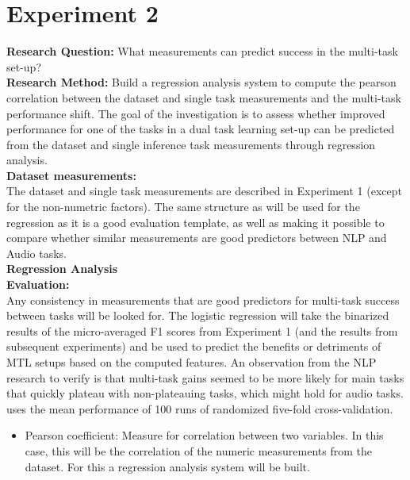 \section{Experiment 2}

\textbf{Research Question:} What measurements can predict success in the multi-task set-up? \\

\textbf{Research Method:} Build a regression analysis system to compute the pearson correlation between the dataset and single task measurements and the multi-task performance shift. The goal of the investigation is to assess whether improved performance for one of the tasks in a dual task learning set-up can be predicted from the dataset and single inference task measurements through regression analysis.\\

\textbf{Dataset measurements:}\\
The dataset and single task measurements are described in Experiment 1 (except for the non-numetric factors). The same structure as \citet{bingel2017identifying} will be used for the regression as it is a good evaluation template, as well as making it possible to compare whether similar measurements are good predictors between NLP and Audio tasks. \\

\textbf{Regression Analysis} \\



\textbf{Evaluation:}\\

Any consistency in measurements that are good predictors for multi-task success between tasks will be looked for. The logistic regression will take the binarized results of the micro-averaged F1 scores from Experiment 1 (and the results from subsequent experiments) and be used to predict the benefits or detriments of MTL setups based on the computed features. An observation from the NLP research to verify is that multi-task gains seemed to be more likely for main tasks that quickly plateau with non-plateauing tasks, which might hold for audio tasks. \citet{bingel2017identifying} uses the mean performance of 100 runs of randomized five-fold cross-validation.

\begin{itemize}
	\item Pearson coefficient: Measure for correlation between two variables. In this case, this will be the correlation of the numeric measurements from the dataset. For this a regression analysis system will be built.
\end{itemize}
